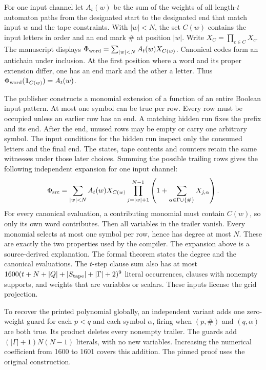 For one input channel let $A_t(w)$ be the sum of the weights of all length-$t$ automaton paths from the designated start to the designated end that match input $w$ and the tape constraints. With $|w|<N$, the set $C(w)$ contains the input letters in order and an end mark $\#$ at position $|w|$. Write $X_C=\prod_{c\in C}X_c$. The manuscript displays $\Phi_{\rm word}=\sum_{|w|<N}A_t(w)X_{C(w)}$. Canonical codes form an antichain under inclusion. At the first position where a word and its proper extension differ, one has an end mark and the other a letter. Thus $\Phi_{\rm word}({\bf1}_{C(w)})=A_t(w)$.

The publisher constructs a monomial extension of a function of an entire Boolean input pattern. At most one symbol can be true per row. Every row must be occupied unless an earlier row has an end. A matching hidden run fixes the prefix and its end. After the end, unused rows may be empty or carry one arbitrary symbol. The input conditions for the hidden run inspect only the consumed letters and the final end. The states, tape contents and counters retain the same witnesses under those later choices. Summing the possible trailing rows gives the following independent expansion for one input channel:
\[
 \Phi_{\rm src}
 =\sum_{|w|<N}A_t(w)X_{C(w)}
    \prod_{j=|w|+1}^{N-1}\left(1+\sum_{\alpha\in\Gamma\cup\{\#\}}
     X_{j,\alpha}\right).
\]
For every canonical evaluation, a contributing monomial must contain $C(w)$, so only its own word contributes. Then all variables in the trailer vanish. Every monomial selects at most one symbol per row, hence has degree at most $N$. These are exactly the two properties used by the compiler. The expansion above is a source-derived explanation. The formal theorem states the degree and the canonical evaluations. The $t$-step clause sum also has at most $1600(t+N+|Q|+|S_{\rm tape}|+|\Gamma|+2)^9$ literal occurrences, clauses with nonempty supports, and weights that are variables or scalars. These inputs license the grid projection.

To recover the printed polynomial globally, an independent variant adds one zero-weight guard for each $p<q$ and each symbol $\alpha$, firing when $(p,\#)$ and $(q,\alpha)$ are both true. Its product deletes every nonempty trailer. The guards add $(|\Gamma|+1)N(N-1)$ literals, with no new variables. Increasing the numerical coefficient from 1600 to 1601 covers this addition. The pinned proof uses the original construction.

